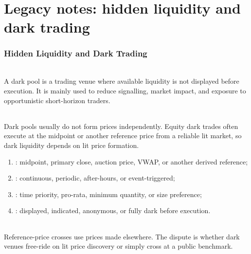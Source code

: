 \documentclass[a4paper,oneside,openany]{book}
\begin{document}
\chapter*{Legacy notes: hidden liquidity and dark trading}

\subsection*{Hidden Liquidity and Dark Trading}

\begin{definition} \\
A dark pool is a trading venue where available liquidity is not displayed before execution. It is mainly used to reduce signalling, market impact, and exposure to opportunistic short-horizon traders.
\end{definition}

\begin{principle} \\
Dark pools usually do not form prices independently. Equity dark trades often execute at the midpoint or another reference price from a reliable lit market, so dark liquidity depends on lit price formation.
\end{principle}

\begin{taxonomy} 
\begin{enumerate}[label=\roman*.]
\setlength{\itemsep}{0pt}
\item {}: midpoint, primary close, auction price, VWAP, or another derived reference;
\item {}: continuous, periodic, after-hours, or event-triggered;
\item {}: time priority, pro-rata, minimum quantity, or size preference;
\item {}: displayed, indicated, anonymous, or fully dark before execution.
\end{enumerate}
\end{taxonomy}

\begin{principle} \\
Reference-price crosses use prices made elsewhere. The dispute is whether dark venues free-ride on lit price discovery or simply cross at a public benchmark.
\end{principle}
\end{document}
